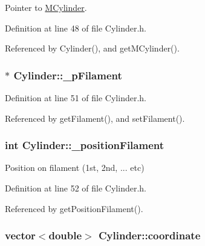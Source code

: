 Pointer to \hyperlink{classMCylinder}{M\+Cylinder}. 



Definition at line 48 of file Cylinder.\+h.



Referenced by Cylinder(), and get\+M\+Cylinder().

\hypertarget{classCylinder_a0229e3f223dc18ef21fef8db0f2f4b51}{
\subsubsection[{\+\_\+p\+Filament}]{$\ast$ Cylinder\+::\+\_\+p\+Filament\hspace{0.3cm}{\ttfamily [private]}}}\label{classCylinder_a0229e3f223dc18ef21fef8db0f2f4b51}


Definition at line 51 of file Cylinder.\+h.



Referenced by get\+Filament(), and set\+Filament().

\hypertarget{classCylinder_a372ecc7b3dc54ca5dd042b043af437d6}{
\subsubsection[{\+\_\+position\+Filament}]{\setlength{\rightskip}{0pt plus 5cm}int Cylinder\+::\+\_\+position\+Filament\hspace{0.3cm}{\ttfamily [private]}}}\label{classCylinder_a372ecc7b3dc54ca5dd042b043af437d6}


Position on filament (1st, 2nd, ... etc) 



Definition at line 52 of file Cylinder.\+h.



Referenced by get\+Position\+Filament().

\hypertarget{classCylinder_a8c7a6cfe1aecf1ee0eff3aaf9c11338f}{
\subsubsection[{coordinate}]{\setlength{\rightskip}{0pt plus 5cm}vector$<$double$>$ Cylinder\+::coordinate}}\label{classCylinder_a8c7a6cfe1aecf1ee0eff3aaf9c11338f}


